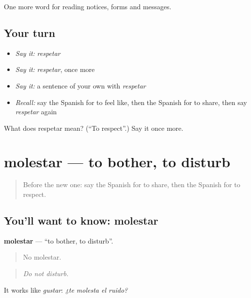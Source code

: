 \begin{grammarlens}[title={What you've built}]
One more word for reading notices, forms and messages.
\end{grammarlens}

\subsection*{Your turn}
\begin{itemize}
\raggedright
  \item \emph{Say it:} \emph{respetar}
  \item \emph{Say it:} \emph{respetar}, once more
  \item \emph{Say it:} a sentence of your own with \emph{respetar}
  \item \emph{Recall:} say the Spanish for to feel like, then the Spanish for to share, then say \emph{respetar} again
\end{itemize}

\begin{tcolorbox}[breakable,colback=teal!4,colframe=teal!35!black,title={Before you move on}]
What does respetar mean? (\textquotedblleft{}To respect\textquotedblright{}.) Say it once more.
\end{tcolorbox}
\section[molestar]{molestar — to bother, to disturb}

\label{lesson:ES-C500-molestar}



\begin{quote}
Before the new one: say the Spanish for to share, then the Spanish for to respect.
\end{quote}

\subsection*{You'll want to know: molestar}
\textbf{molestar} — \textquotedblleft{}to bother, to disturb\textquotedblright{}.

\begin{quote}
No molestar.
\end{quote}

\begin{quote}
\emph{Do not disturb.}
\end{quote}

It works like \emph{gustar}: \emph{¿te molesta el ruido?}

